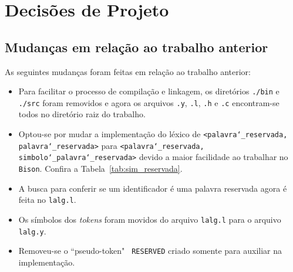 \section{Decisões de Projeto \label{sec:decisoes-de-projeto}}

\subsection{Mudanças em relação ao trabalho anterior}

As seguintes mudanças foram feitas em relação ao trabalho anterior:

\begin{itemize}

	\item Para facilitar o processo de compilação e linkagem, os diretórios \texttt{./bin} e \texttt{./src} foram removidos e agora os arquivos \texttt{.y}, \texttt{.l}, \texttt{.h} e \texttt{.c} encontram-se todos no diretório raiz do trabalho.

\newpage
	\item Optou-se por mudar a implementação do léxico de \texttt{<palavra\char`_reservada, palavra\char`_reservada>} para \texttt{<palavra\char`_reservada, simbolo\char`_palavra\char`_reservada>} devido a maior facilidade ao trabalhar no \texttt{Bison}. Confira a Tabela~\ref{tab:sim_reservada}.

	\item A busca para conferir se um identificador é uma palavra reservada agora é feita no \texttt{lalg.l}.

	\item Os símbolos dos \textit{tokens} foram movidos do arquivo \texttt{lalg.l} para o arquivo \texttt{lalg.y}.

	\item Removeu-se o ``pseudo-token" \texttt{ RESERVED} criado somente para auxiliar na implementação.

\end{itemize}

